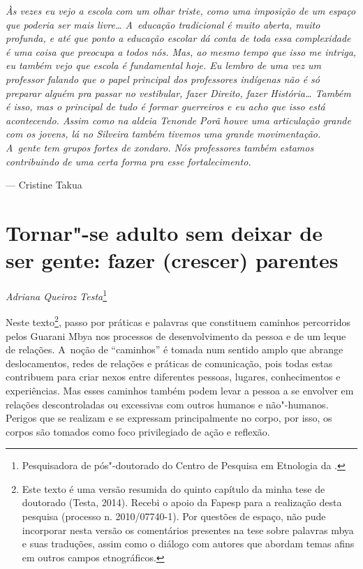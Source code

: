 \begin{flushleft}
\begin{minipage}[c]{0.85\textwidth}
\raggedright
\footnotesize
\emph{Às vezes eu vejo a escola com um olhar triste, como uma imposição de um
espaço que poderia ser mais livre\ldots{} A~educação tradicional é muito
aberta, muito profunda, e até que ponto a educação escolar dá conta de
toda essa complexidade é uma coisa que preocupa a todos nós. Mas, ao
mesmo tempo que isso me intriga, eu também vejo que escola é
fundamental hoje. Eu lembro de uma vez um professor falando que o papel
principal dos professores indígenas não é só preparar alguém pra passar
no vestibular, fazer Direito, fazer História\ldots{} Também é isso, mas o
principal de tudo é formar guerreiros e eu acho que isso está
acontecendo. Assim como na aldeia Tenonde Porã houve uma articulação
grande com os jovens, lá no Silveira também tivemos uma grande
movimentação. A~gente tem grupos fortes de \emph{xondaro}. Nós professores
também estamos contribuindo de uma certa forma pra esse fortalecimento.}

\smallskip
\hspace*{\fill}--- Cristine Takua
\end{minipage}
\end{flushleft}

\chapter{Tornar"-se adulto sem deixar de ser gente: fazer (crescer)
parentes}
\begin{flushright}
\emph{Adriana Queiroz Testa}\footnote{Pesquisadora de pós"-doutorado do Centro
de Pesquisa em Etnologia da .}
\end{flushright}

\noindent
Neste texto\footnote{Este texto é uma versão resumida do quinto capítulo
da minha tese de doutorado (Testa, 2014). Recebi o apoio da Fapesp para
a realização desta pesquisa (processo n. 2010/07740-1). Por questões de
espaço, não pude incorporar nesta versão os comentários presentes na
tese sobre palavras mbya e suas traduções, assim como o diálogo com
autores que abordam temas afins em outros campos etnográficos.}, passo
por práticas e palavras que constituem caminhos percorridos pelos
Guarani Mbya nos processos de desenvolvimento da pessoa e de um leque
de relações. A~noção de ``caminhos'' é tomada num sentido amplo que abrange
deslocamentos, redes de relações e práticas de comunicação, pois todas
estas contribuem para criar nexos entre diferentes pessoas, lugares,
conhecimentos e experiências. Mas esses caminhos também podem levar a
pessoa a se envolver em relações descontroladas ou excessivas com
outros humanos e não"-humanos. Perigos que se realizam e se expressam
principalmente no corpo, por isso, os corpos são tomados como foco
privilegiado de ação e reflexão.

